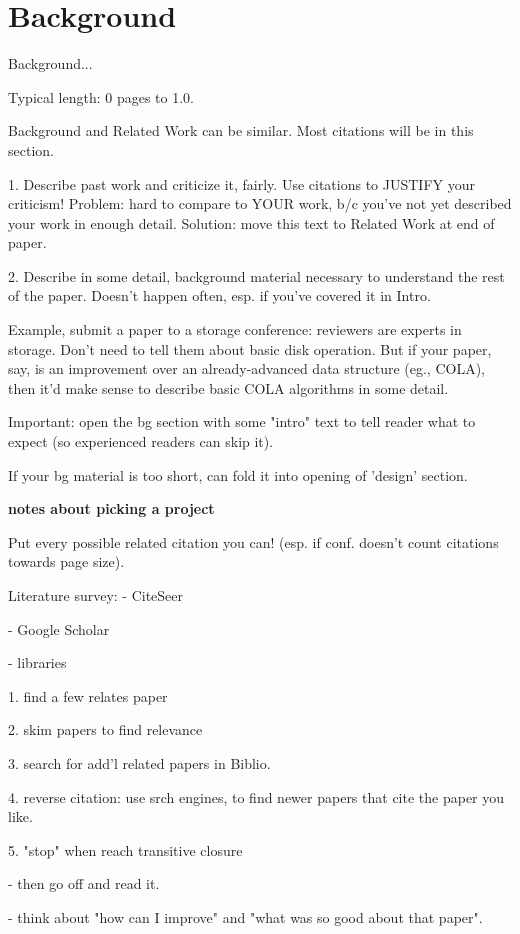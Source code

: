 \section{Background}
\label{bg}

Background...

Typical length: 0 pages to 1.0.

Background and Related Work can be similar.
Most citations will be in this section.

1. Describe past work and criticize it, fairly.  Use citations
   to JUSTIFY your criticism!  Problem: hard to compare to YOUR
   work, b/c you've not yet described your work in enough
   detail.  Solution: move this text to Related Work at end of
   paper.

2. Describe in some detail, background material necessary to
   understand the rest of the paper.  Doesn't happen often,
   esp. if you've covered it in Intro.

Example, submit a paper to a storage conference: reviewers are
experts in storage.  Don't need to tell them about basic disk
operation.  But if your paper, say, is an improvement over an
already-advanced data structure (eg., COLA), then it'd make
sense to describe basic COLA algorithms in some detail.

Important: open the bg section with some "intro" text to tell
reader what to expect (so experienced readers can skip it).

If your bg material is too short, can fold it into opening of
'design' section.


\textbf{notes about picking a project}

Put every possible related citation you can! (esp. if conf.
doesn't count citations towards page size).

Literature survey:
- CiteSeer

- Google Scholar

- libraries

1. find a few relates paper

2. skim papers to find relevance

3. search for add'l related papers in Biblio.

4. reverse citation: use srch engines, to find
   newer papers that cite the paper you like.

5. "stop" when reach transitive closure

- then go off and read it.

- think about "how can I improve" and "what was so
  good about that paper".

